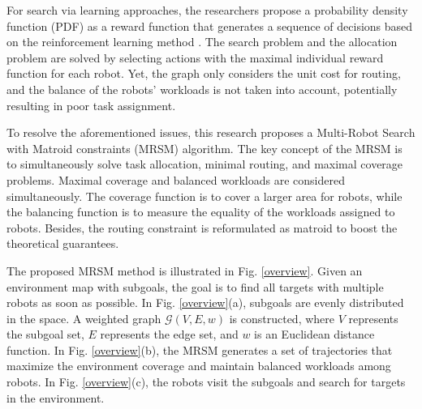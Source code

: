 

For search via learning approaches,
the researchers propose a probability density function (PDF) as a reward function that generates a sequence of decisions based on the reinforcement learning method \cite{sheng2022pd}.
The search problem and the allocation problem are solved by selecting actions with the maximal individual reward function for each robot.
Yet, the graph only considers the unit cost for routing, and the balance of the robots' workloads is not taken into account, potentially resulting in poor task assignment.

To resolve the aforementioned issues, this research proposes a Multi-Robot Search with Matroid constraints (MRSM) algorithm.
The key concept of the MRSM is to simultaneously solve task allocation, minimal routing, and maximal coverage problems.
Maximal coverage and balanced workloads are considered simultaneously.
The coverage function is to cover a larger area for robots, while the balancing function is to measure the equality of the workloads assigned to robots.
Besides, the routing constraint is reformulated as matroid to boost the theoretical guarantees.

The proposed MRSM method is illustrated in Fig. \ref{overview}. Given an environment map with subgoals, the goal is to find all targets with multiple robots as soon as possible.
In Fig. \ref{overview}(a), subgoals are evenly distributed in the space. A weighted graph $\mathcal{G}(V,E, w)$ is constructed, where $V$ represents the subgoal set, $E$ represents the edge set, and $w$ is an Euclidean distance function.
In Fig. \ref{overview}(b), the MRSM generates a set of trajectories that maximize the environment coverage and maintain balanced workloads among robots.
In Fig. \ref{overview}(c), the robots visit the subgoals and search for targets in the environment.

